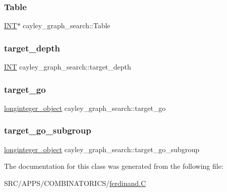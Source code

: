 \subsubsection{\texorpdfstring{Table}{Table}}
{\footnotesize\ttfamily \mbox{\hyperlink{galois_8h_a09fddde158a3a20bd2dcadb609de11dc}{I\+NT}}$\ast$ cayley\+\_\+graph\+\_\+search\+::\+Table}

\mbox{\label{classcayley__graph__search_a361db837b607bed8b7264552a9695d81}} 
\subsubsection{\texorpdfstring{target\+\_\+depth}{target\_depth}}
{\footnotesize\ttfamily \mbox{\hyperlink{galois_8h_a09fddde158a3a20bd2dcadb609de11dc}{I\+NT}} cayley\+\_\+graph\+\_\+search\+::target\+\_\+depth}

\mbox{\label{classcayley__graph__search_af0b5d1eca51ad295afb7c5a3aaf9d4c9}} 
\subsubsection{\texorpdfstring{target\+\_\+go}{target\_go}}
{\footnotesize\ttfamily \mbox{\hyperlink{classlonginteger__object}{longinteger\+\_\+object}} cayley\+\_\+graph\+\_\+search\+::target\+\_\+go}

\mbox{\label{classcayley__graph__search_a6069949f871cc486783975bac61e49bf}} 
\subsubsection{\texorpdfstring{target\+\_\+go\+\_\+subgroup}{target\_go\_subgroup}}
{\footnotesize\ttfamily \mbox{\hyperlink{classlonginteger__object}{longinteger\+\_\+object}} cayley\+\_\+graph\+\_\+search\+::target\+\_\+go\+\_\+subgroup}



The documentation for this class was generated from the following file\+:\begin{DoxyCompactItemize}
\item 
S\+R\+C/\+A\+P\+P\+S/\+C\+O\+M\+B\+I\+N\+A\+T\+O\+R\+I\+C\+S/\mbox{\hyperlink{ferdinand_8_c}{ferdinand.\+C}}\end{DoxyCompactItemize}
